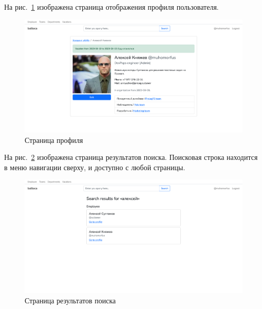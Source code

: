 \newpage

На рис.~\ref{img:ss2} изображена страница отображения профиля пользователя.

\begin{figure}[h!]
\centering
    \includegraphics[width=0.9\linewidth]{assets/ss2.png}
    \caption{Страница профиля}
    \label{img:ss2}	
\end{figure}

На рис.~\ref{img:ss3} изображена страница результатов поиска. Поисковая строка находится в меню навигации сверху, и доступно с любой страницы.

\begin{figure}[h!]
\centering
    \includegraphics[width=0.9\linewidth]{assets/ss4.png}
    \caption{Страница результатов поиска}
    \label{img:ss3}	
\end{figure}

